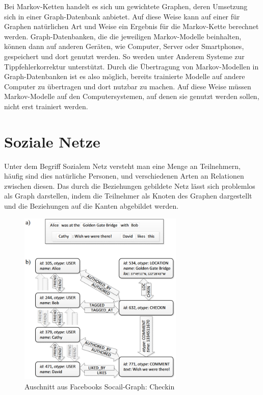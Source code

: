 Bei Markov-Ketten handelt es sich um gewichtete Graphen, deren Umsetzung sich in einer Graph-Datenbank anbietet. Auf diese Weise kann auf einer für Graphen natürlichen Art und Weise ein Ergebnis für die Markov-Kette berechnet werden. Graph-Datenbanken, die die jeweiligen Markov-Modelle beinhalten, können dann auf anderen Geräten, wie Computer, Server oder Smartphones, gespeichert und dort genutzt werden. So werden unter Anderem Systeme zur Tippfehlerkorrektur unterstützt. Durch die Übertragung von Markov-Modellen in Graph-Datenbanken ist es also möglich, bereits trainierte Modelle auf andere Computer zu übertragen und dort nutzbar zu machen. Auf diese Weise müssen Markov-Modelle auf den Computersystemen, auf denen sie genutzt werden sollen, nicht erst trainiert werden.

\section{Soziale Netze}
Unter dem Begriff Sozialem Netz versteht man eine Menge an Teilnehmern, häufig sind dies natürliche Personen, und verschiedenen Arten an Relationen zwischen diesen. Das durch die Beziehungen gebildete Netz lässt sich problemlos als Graph darstellen, indem die Teilnehmer als Knoten des Graphen dargestellt und die Beziehungen auf die Kanten abgebildet werden.

\begin{figure}
	\caption{Auschnitt aus Facebooks Socail-Graph: Checkin \cite{facebookTao}}
	\label{fig:fbCheckin}
	\centering
	\includegraphics[width=0.7\textwidth]{images/facebook_checkin.png}
\end{figure}

